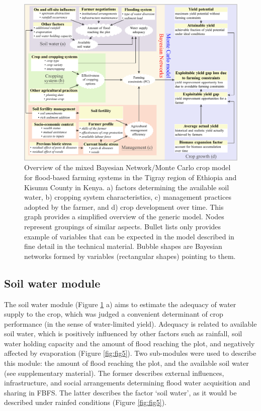 \documentclass[]{elsarticle} %
\begin{document}
\begin{figure}[!h]

{\centering \includegraphics[width=1\linewidth,]{figures/overview-model-1} 

}

\caption{Overview of the mixed Bayesian Network/Monte Carlo crop model for flood-based farming systems in the Tigray region of Ethiopia and Kisumu County in Kenya. a) factors determining the available soil water, b) cropping system characteristics, c) management practices adopted by the farmer, and d) crop development over time. This graph provides a simplified overview of the generic model. Nodes represent groupings of similar aspects. Bullet lists only provides example of variables that can be expected in the model described in fine detail in the technical material. Bubble shapes are Bayesian networks formed by variables (rectangular shapes) pointing to them.}\label{fig:fig4}
\end{figure}

\hypertarget{ref42}{%
\subsection{Soil water module}\label{ref42}}

The soil water module (Figure \ref{fig:fig4} a) aims to estimate the adequacy of water supply to the crop, which was judged a convenient determinant of crop performance (in the sense of water-limited yield). Adequacy is related to available soil water, which is positively influenced by other factors such as rainfall, soil water holding capacity and the amount of flood reaching the plot, and negatively affected by evaporation (Figure \ref{fig:fig5}). Two sub-modules were used to describe this module: the amount of flood reaching the plot, and the available soil water (see supplementary material). The former describes external influences, infrastructure, and social arrangements determining flood water acquisition and sharing in FBFS. The latter describes the factor `soil water', as it would be described under rainfed conditions (Figure \ref{fig:fig5}).
\end{document}
